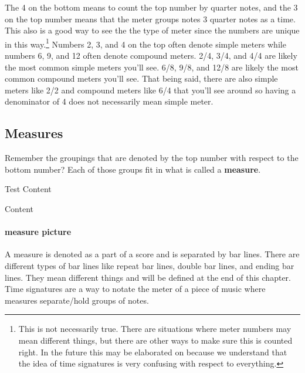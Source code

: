\documentclass[../OpenAppliedMusicTheory.tex]{subfiles}
\begin{document}
        The 4 on the bottom means to count the top number by quarter notes, and the 3 on the top number means that the meter groups notes 3 quarter notes as a time. This also is a good way to see the the type of meter since the numbers are unique in this way.\footnote{This is not necessarily true. There are situations where meter numbers may mean different things, but there are other ways to make sure this is counted right. In the future this may be elaborated on because we understand that the idea of time signatures is very confusing with respect to everything.} Numbers 2, 3, and 4 on the top often denote simple meters while numbers 6, 9, and 12 often denote compound meters. 2/4, 3/4, and 4/4 are likely the most common simple meters you'll see. 6/8, 9/8, and 12/8 are likely the most common compound meters you'll see. That being said, there are also simple meters like 2/2 and compound meters like 6/4 that you'll see around so having a denominator of 4 does not necessarily mean simple meter. 

        \subsection{Measures}
        Remember the groupings that are denoted by the top number with respect to the bottom number? Each of those groups fit in what is called a \textbf{measure}. 

        \begin{aside}{Test}
            Content
        \end{aside}

        \begin{checkpoint}
            Content
        \end{checkpoint}    

        \paragraph{measure picture}
        A measure is denoted as a part of a score and is separated by bar lines. There are different types of bar lines like repeat bar lines, double bar lines, and ending bar lines. They mean different things and will be defined at the end of this chapter. Time signatures are a way to notate the meter of a piece of music where measures separate/hold groups of notes.
\end{document}
